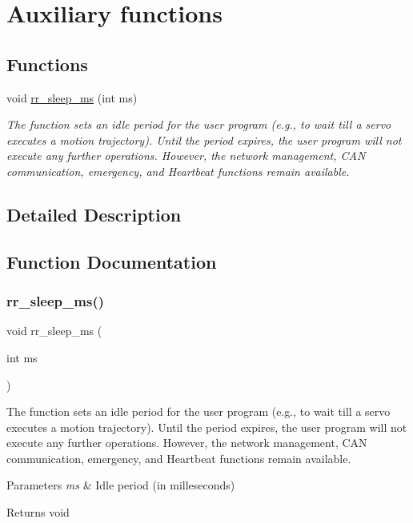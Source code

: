 \hypertarget{group___aux}{}\section{Auxiliary functions}
\label{group___aux}
\subsection*{Functions}
\begin{DoxyCompactItemize}
\item 
void \hyperlink{group___aux_gaeb26028b83635e028ebc901e1cbf33a1}{rr\+\_\+sleep\+\_\+ms} (int ms)
\begin{DoxyCompactList}\small\item\em The function sets an idle period for the user program (e.\+g., to wait till a servo executes a motion trajectory). Until the period expires, the user program will not execute any further operations. However, the network management, C\+AN communication, emergency, and Heartbeat functions remain available. \end{DoxyCompactList}\end{DoxyCompactItemize}


\subsection{Detailed Description}


\subsection{Function Documentation}
\mbox{\label{group___aux_gaeb26028b83635e028ebc901e1cbf33a1}} 
\subsubsection{\texorpdfstring{rr\+\_\+sleep\+\_\+ms()}{rr\_sleep\_ms()}}
{\footnotesize\ttfamily void rr\+\_\+sleep\+\_\+ms (\begin{DoxyParamCaption}\item[{int}]{ms }\end{DoxyParamCaption})}



The function sets an idle period for the user program (e.\+g., to wait till a servo executes a motion trajectory). Until the period expires, the user program will not execute any further operations. However, the network management, C\+AN communication, emergency, and Heartbeat functions remain available. 


\begin{DoxyParams}{Parameters}
{\em ms} & Idle period (in milleseconds) \\
\hline
\end{DoxyParams}
\begin{DoxyReturn}{Returns}
void 
\end{DoxyReturn}
